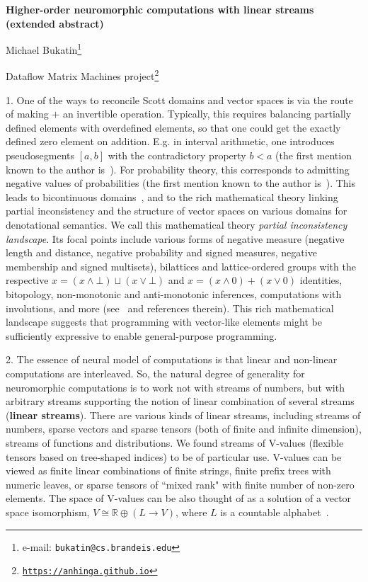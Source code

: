 \documentclass{article}
\begin{document}
\begin{center}

{\bf Higher-order neuromorphic computations with linear streams (extended abstract)}

\vspace{0.1in}
Michael Bukatin\footnote{e-mail: {\tt bukatin@cs.brandeis.edu}}

\vspace{0.1in}
Dataflow Matrix Machines project\footnote{\href{https://anhinga.github.io}{\tt https://anhinga.github.io}}

\end{center}

1. One of the ways to reconcile Scott domains and vector spaces is via the route of making $+$ an invertible operation.
Typically, this requires balancing partially defined elements with overdefined elements, so that one could get the
exactly defined zero element on addition. E.g. in interval arithmetic, one introduces pseudosegments $[a, b]$ with the contradictory property $b < a$ (the first mention known to the author is~\cite{Warmus}). For probability theory, this corresponds
to admitting negative values of probabilities (the first mention known to the author is~\cite{Wigner}). This leads to bicontinuous domains~\cite{Keimel}, 
and to the rich mathematical theory linking partial inconsistency and the structure of vector spaces on
various domains for denotational semantics. We call this mathematical theory {\em partial inconsistency landscape}.
Its focal points include various forms of negative measure (negative length and distance, negative probability and signed
measures, negative membership and signed multisets), bilattices and lattice-ordered groups with the respective
$x=(x\wedge\bot)\sqcup(x\vee\bot)$ and $x=(x\wedge 0)+(x\vee 0)$ identities, bitopology,  non-monotonic and anti-monotonic inferences, computations with involutions, and more (see~\cite{BukatinMatthews} and references therein).
This rich mathematical landscape suggests that programming with vector-like elements might be sufficiently expressive to
enable general-purpose programming. 

2. The essence of neural model of computations is that linear and non-linear computations are interleaved.  So, the natural degree of generality for neuromorphic computations is to work not with streams of numbers, but with arbitrary streams supporting the notion of linear combination of several streams ({\bf linear streams}). There  are  various  kinds  of  linear  streams, including  streams  of  numbers,  sparse  vectors  and  sparse tensors (both of finite and infinite dimension), 
streams of functions and distributions. We found streams of V-values (flexible tensors based on tree-shaped indices) to be of particular use. V-values can be viewed as finite linear combinations of finite strings, finite prefix trees with numeric leaves, or
sparse tensors of ``mixed rank" with finite number of non-zero elements. The space of V-values can be also thought of as a solution of a vector space isomorphism, $V \cong \mathbb{R}\oplus (L \rightarrow V)$, where $L$ is a countable alphabet~\cite{BukatinAnthony}.
\end{document}
